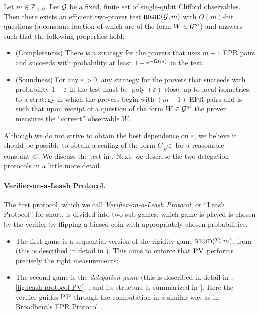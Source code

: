 \documentclass{toc}
\DeclareMathOperator{\poly}{poly}
\newcommand{\eps}{\varepsilon}
\newcommand{\rigid}{\textsc{rigid}}
\newcommand{\pv}{\textsc{PV}}
\newcommand{\pp}{\textsc{PP}}
\begin{document}
\begin{theorem}[Informal]\label{thm:rigid-informal}
Let $m\in\mathbb{Z}_{>0}$. Let $\cal G$ be a fixed, finite set of single-qubit Clifford observables. Then there exists an efficient two-prover test $\textsc{rigid}({\cal G},m)$ with $O(m)$-bit questions (a constant fraction of which are of the form $W\in{\cal G}^m$) and answers such that the following properties hold:
\begin{itemize}[nolistsep]
\item (Completeness) There is a strategy for the provers that uses $m+1$ EPR pairs and succeeds with probability at least $1 - \mathrm e^{-\Omega(m)}$ in the test.
\item (Soundness) For any $\eps>0$, any strategy for the provers that succeeds with probability $1-\eps$ in the test must be $\poly(\eps)$-close, up to local isometries, to a strategy in which the provers begin with $(m+1)$ EPR pairs and is such that upon receipt of a question of the form $W\in {\cal G}^m$ the prover measures the ``correct'' observable $W$. 
\end{itemize}
\end{theorem}

Although we do not strive to obtain the best dependence on $\eps$, we believe it
should be possible to obtain a scaling of the form $C\sqrt{\eps}$ for a
reasonable constant~$C$. We discuss the test in . Next, we describe the two delegation protocols in a little more detail.

\paragraph{Verifier-on-a-Leash Protocol.}
The first protocol, which we call \emph{Verifier-on-a-Leash
Protocol}, or ``Leash Protocol'' for short, is divided into two sub-games; which game is played is chosen by the verifier by flipping a biased coin with appropriately chosen probabilities.
\begin{itemize}[nolistsep]
\item The first game is a sequential version of the rigidity game $\rigid(\Sigma,m)$, from  (this is described in detail in ). This aims to enforce that $\pv$ performs precisely the right measurements;
\item The second game is the \emph{delegation game} (this is described in detail in , \ref{fig:leash-protocol-PV}, , and its structure is summarized in ). Here the verifier guides $\pp$ through the computation in a similar way as in Broadbent's EPR Protocol \cite{broadbent15howtoverify}.
\end{itemize}
\end{document}
